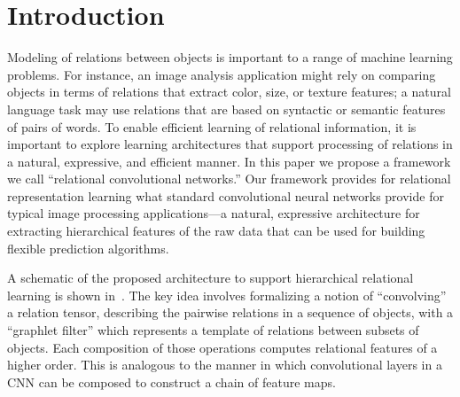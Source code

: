 \section{Introduction}\label{sec:intro}

Modeling of relations between objects is important to a range of machine learning problems. For instance, an image analysis application might rely on comparing objects in terms of relations that extract color, size, or texture features; a natural language task may use relations that are based on syntactic or semantic features of pairs of words. To enable efficient learning of relational information, it is important to explore learning architectures that support processing of relations in a natural, expressive, and efficient manner. In this paper we propose a framework we call ``relational convolutional networks.'' Our framework provides for relational representation learning what standard convolutional neural networks provide for typical image processing applications---a natural, expressive architecture for extracting hierarchical features of the raw data that can be used for building flexible prediction algorithms.

A schematic of the proposed architecture to support hierarchical relational learning is shown in~. The key idea involves formalizing a notion of ``convolving'' a relation tensor, describing the pairwise relations in a sequence of objects, with a ``graphlet filter'' which represents a template of relations between subsets of objects. Each composition of those operations computes relational features of a higher order. This is analogous to the manner in which convolutional layers in a CNN can be composed to construct a chain of feature maps.


